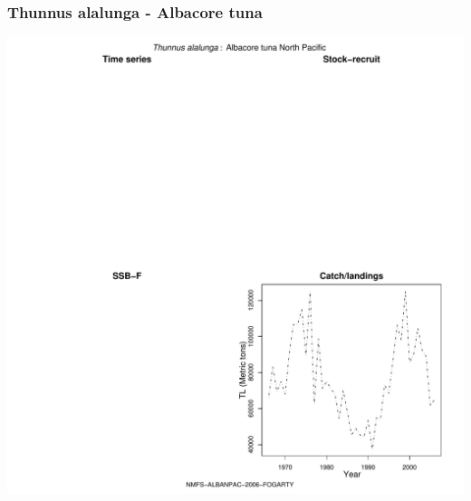 \subsubsection{Thunnus alalunga - Albacore tuna}
\begin{center}
\includegraphics[width=1.2\textwidth]{../R/figures/NMFS-ALBANPAC-2006-FOGARTY.pdf}
\end{center}

